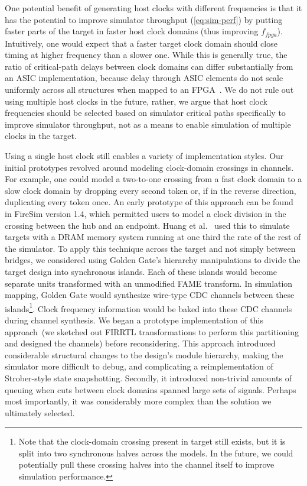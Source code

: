 One potential benefit of generating host clocks with different frequencies is
that it has the potential to improve simulator throughput (\ref{eq:sim-perf})
by putting faster parts of the target in faster host clock domains (thus
improving $f_{fpga}$). Intuitively, one would expect that a faster target clock
domain should close timing at higher frequency than a
slower one. While this is generally true, the ratio of critical-path delays
between clock domains can differ substantially from an ASIC implementation, because delay through ASIC elements do
not scale uniformly across all structures when mapped to an FPGA~\cite{FPGAGap, FPGAGap2}.
We do not rule out using multiple host clocks in the future, rather, we
argue that host clock frequencies should be selected based on simulator
critical paths specifically to improve simulator throughput, not as a means to enable
simulation of multiple clocks in the target.

Using a single host clock still enables a variety of implementation
styles. Our initial prototypes revolved around modeling clock-domain crossings
in channels. For example, one could model a two-to-one crossing from a fast clock
domain to a slow clock domain by dropping every second token or, if in the
reverse direction, duplicating every token once. An early prototype of this
approach can be found in FireSim version 1.4, which permitted users to
model a clock division in the crossing between the hub and an endpoint.
Huang et al.~\cite{centrifuge} used this to simulate targets with a DRAM memory system running
at one third the rate of the rest of the simulator. To apply this technique across
the target and not simply between bridges, we considered using Golden
Gate's hierarchy manipulations to divide the target design into synchronous
islands. Each of these islands would become separate units transformed with an unmodified FAME transform.
In simulation mapping, Golden Gate would synthesize wire-type CDC channels between
these islands\footnote{Note that the clock-domain crossing present in target still
exists, but it is split into two synchronous halves across the models. In the future, we could
potentially pull these crossing halves into the channel itself to improve simulation
performance.}. Clock frequency information would be baked into
these CDC channels during channel synthesis. We began a prototype implementation of this
approach~(we sketched out FIRRTL transformations to perform this partitioning
and designed the channels) before reconsidering.  This approach introduced
considerable structural changes to the design's module hierarchy, making the
simulator more difficult to debug, and complicating a reimplementation of
Strober-style state snapshotting. Secondly, it introduced non-trivial
amounts of queuing when cuts between clock domains spanned large sets of signals.
Perhaps most importantly, it was considerably more complex than the solution we
ultimately selected.

